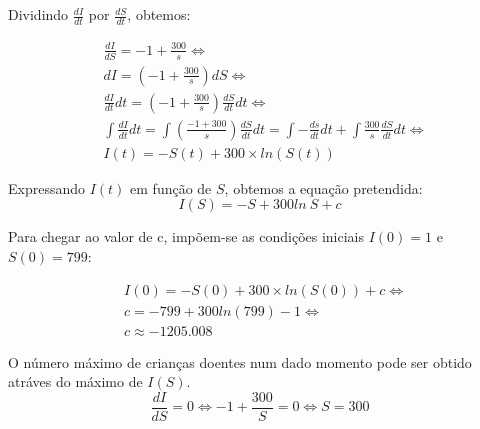 \documentclass[portuguese, a4paper]{article}
\begin{document}
	\subsection{} \label{sec:III.2}
		\subsubsection{} \label{sec:III.2a)}
		\par %
		Dividindo $\frac{dI}{dt}$ por $\frac{dS}{dt}$, obtemos:

		\begin{equation} \label{di}
		\begin{split}
			& \frac{dI}{dS} = -1 + \frac{300}{s} \Leftrightarrow \\
			& dI = \left(-1 + \frac{300}{s}\right)dS \Leftrightarrow \\
			& \frac{dI}{dt} dt = \left( -1 + \frac{300}{s}\right) \frac{dS}{dt} dt \Leftrightarrow \\
			& \int\frac{dI}{dt}dt = \int\left(\frac{-1 + 300}{s}\right)\frac{dS}{dt}dt = \int - \frac{ds}{dt}dt + \int\frac{300}{s}\frac{dS}{dt}dt \Leftrightarrow \\
			& I(t) = -S(t) + 300 \times ln(S(t))
		\end{split}
		\end{equation}

		\par
		Expressando $I(t)$ em função de $S$, obtemos a equação pretendida:
        $$I(S) = -S + 300ln~S + c$$

		\par
		Para chegar ao valor de c, impõem-se as condições iniciais $I(0) = 1$ e $S(0) = 799$:

		\begin{equation}
		\begin{split}
			& I(0) = -S(0) + 300 \times ln(S(0)) + c \Leftrightarrow \\
			& c = -799 + 300ln(799) - 1 \Leftrightarrow \\
			& c \approx -1205.008
		\end{split}
		\end{equation}

		\par
		O número máximo de crianças doentes num dado momento pode ser obtido
		atráves do máximo de $I(S)$.
		\begin{equation}
			\label{eq:root}
			\frac{dI}{dS} = 0 \Leftrightarrow -1 + \frac{300}{S} = 0
			\Leftrightarrow S = 300
		\end{equation}
\end{document}
